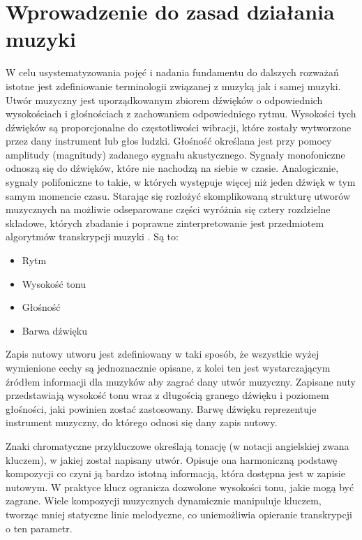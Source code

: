 \documentclass[12pt,a4paper,twoside]{mwart}
\begin{document}
\clearpage
\setcounter{secnumdepth}{4}

\section{Wprowadzenie do zasad działania muzyki}\label{sec:JakDzialaMuzyka}
W celu usystematyzowania pojęć i nadania fundamentu do dalszych rozważań istotne jest zdefiniowanie terminologii związanej z muzyką jak i samej muzyki. Utwór muzyczny jest uporządkowanym zbiorem dźwięków o odpowiednich wysokościach i głośnościach z zachowaniem odpowiedniego rytmu. Wysokości tych dźwięków są proporcjonalne do częstotliwości wibracji, które zostały wytworzone przez dany instrument lub głos ludzki. Głośność określana jest przy pomocy amplitudy (magnitudy) zadanego sygnału akustycznego. Sygnały monofoniczne odnoszą się do dźwięków, które nie nachodzą na siebie w czasie. Analogicznie, sygnały polifoniczne to takie, w których występuje więcej niż jeden dźwięk w tym samym momencie czasu. Starając się rozłożyć skomplikowaną strukturę utworów muzycznych na możliwie odseparowane części wyróżnia się cztery rozdzielne składowe, których zbadanie i poprawne zinterpretowanie jest przedmiotem algorytmów transkrypcji muzyki
\cite[63]{Homerecording:DlaKazdego}.
Są to:
\begin{itemize}
\item Rytm
\item Wysokość tonu
\item Głośność
\item Barwa dźwięku
\end{itemize}
Zapis nutowy utworu jest zdefiniowany w taki sposób, że wszystkie wyżej wymienione cechy są jednoznacznie opisane, z kolei ten jest wystarczającym źródłem informacji dla muzyków aby zagrać dany utwór muzyczny. Zapisane nuty przedstawiają wysokość tonu wraz z długością granego dźwięku i poziomem głośności, jaki powinien zostać zastosowany. Barwę dźwięku reprezentuje instrument muzyczny, do którego odnosi się dany zapis nutowy.

Znaki chromatyczne przykluczowe określają tonację (w notacji angielskiej zwana kluczem), w jakiej został napisany utwór. Opisuje ona harmoniczną podstawę kompozycji co czyni ją bardzo istotną informacją, która dostępna jest w zapisie nutowym. W praktyce klucz ogranicza dozwolone wysokości tonu, jakie mogą być zagrane. Wiele kompozycji muzycznych dynamicznie manipuluje kluczem, tworząc mniej statyczne linie melodyczne, co uniemożliwia opieranie transkrypcji o ten parametr.
\end{document}
